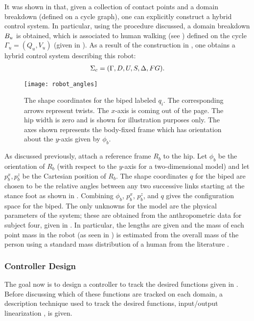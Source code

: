 It was shown in  that, given a collection of contact
points and a domain breakdown (defined on a cycle graph), one can explicitly
construct a hybrid control system.
%
In particular, using the procedure discussed, a domain breakdown $B_u$ is
obtained, which is associated to human walking (see
) defined on the cycle $\Gamma_u = (Q_u,V_u)$ (given
in ).
%
As a result of the construction in , one obtains a
hybrid control system describing this robot:
%
\begin{align}
  \label{eq:hcstime}
  \Sigma_{c} = (\Gamma, D, U, S, \Delta, FG).
\end{align}
%
\begin{figure}[t!]
  \centering
  \texttt{[image: robot\_angles]}
  \caption[The shape coordinates for the biped labeled $q_i$.]{The shape
    coordinates for the biped labeled $q_i$.
    The corresponding arrows represent twists. The $x$-axis is coming out of the
    page.
    The hip width is zero and is shown for illustration purposes only.
    The axes shown represents the body-fixed frame which has orientation about
    the $y$-axis given by $\phi_b$.}
  \label{fig:shapecoords}
\end{figure}
%
As discussed previously, attach a reference frame $R_b$ to the hip. Let $\phi_b$
be the orientation of $R_b$ (with respect to the $y$-axis for a two-dimensional
model) and let $p_b^x, p_b^z$ be the Cartesian position of $R_b$.
%
The shape coordinates $q$ for the biped are chosen to be the relative angles
between any two successive links starting at the stance foot as shown in
.
%
Combining $\phi_b$, $p_b^x$, $p_b^z$, and $q$ gives the configuration space for
the biped.
%
The only unknowns for the model are the physical parameters of the system;
%
these are obtained from the anthropometric data for subject four, given in
.
%
In particular, the lengths are given and the mass of each point mass in the
robot (as seen in ) is estimated from the overall
mass of the person using a standard mass distribution of a human from the
literature \cite{Winter2009}.

\subsubsection{Controller Design}
The goal now is to design a controller to track the desired functions given in
.
%
Before discussing which of these functions are tracked on each domain, a
description technique used to track the desired functions, input/output
linearization \cite[Ch.~9]{Sastry1999}, is given. %

